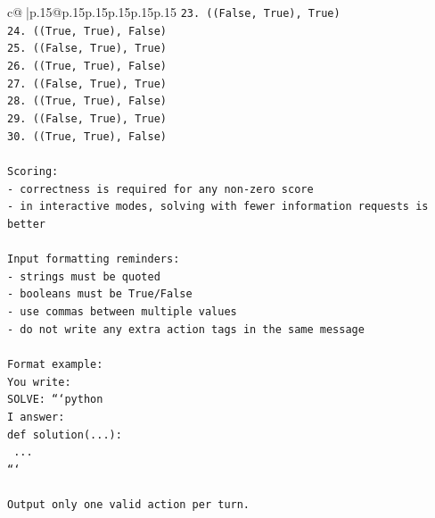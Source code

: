 \documentclass{article}
\begin{document}
{\begin{supertabular}{c@{$\;$}|p{.15\linewidth}@{}p{.15\linewidth}p{.15\linewidth}p{.15\linewidth}p{.15\linewidth}p{.15\linewidth}}
{{{\texttt{23. ((False, True), True)} \\
\texttt{24. ((True, True), False)} \\
\texttt{25. ((False, True), True)} \\
\texttt{26. ((True, True), False)} \\
\texttt{27. ((False, True), True)} \\
\texttt{28. ((True, True), False)} \\
\texttt{29. ((False, True), True)} \\
\texttt{30. ((True, True), False)} \\
\\ 
\texttt{Scoring:} \\
\texttt{{-} correctness is required for any non{-}zero score} \\
\texttt{{-} in interactive modes, solving with fewer information requests is better} \\
\\ 
\texttt{Input formatting reminders:} \\
\texttt{{-} strings must be quoted} \\
\texttt{{-} booleans must be True/False} \\
\texttt{{-} use commas between multiple values} \\
\texttt{{-} do not write any extra action tags in the same message} \\
\\ 
\texttt{Format example:} \\
\texttt{You write:} \\
\texttt{SOLVE: ```python} \\
\texttt{I answer:} \\
\texttt{def solution(...):} \\
\texttt{    ...} \\
\texttt{```} \\
\\ 
\texttt{Output only one valid action per turn.} \\
            }
        }
    }
     \\ \\


\end{supertabular}}
\end{document}
